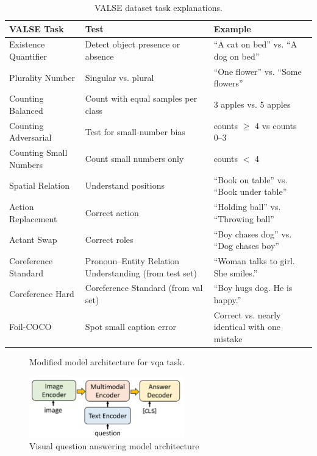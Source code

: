 \begin{table}[h]
    \caption{VALSE dataset task explanations.}
    \label{tab:valse_detail}
    \centering
    \begin{tabular}{|l|p{4cm}|p{5cm}|}
        \hline
        \textbf{VALSE Task} & \textbf{Test} & \textbf{Example} \\ \hline
        Existence Quantifier & Detect object presence or absence & ``A cat on bed'' vs. ``A dog on bed'' \\ \hline
        Plurality Number & Singular vs. plural & ``One flower'' vs. ``Some flowers'' \\ \hline
        Counting Balanced & Count with equal samples per class & 3 apples vs. 5 apples \\ \hline
        Counting Adversarial & Test for small-number bias & counts $\ge$ 4 vs counts 0–3 \\ \hline
        Counting Small Numbers & Count small numbers only & counts $<$ 4 \\ \hline
        Spatial Relation & Understand positions & ``Book on table'' vs. ``Book under table'' \\ \hline
        Action Replacement & Correct action & ``Holding ball'' vs. ``Throwing ball'' \\ \hline
        Actant Swap & Correct roles & ``Boy chases dog'' vs. ``Dog chases boy'' \\ \hline
        Coreference Standard & Pronoun–Entity Relation Understanding (from test set) & ``Woman talks to girl. She smiles.'' \\ \hline
        Coreference Hard & Coreference Standard (from val set) & ``Boy hugs dog. He is happy.'' \\ \hline
        Foil-COCO & Spot small caption error & Correct vs. nearly identical with one mistake \\ \hline
    \end{tabular}
\end{table}

\begin{figure}[h]
    \caption{Visual question answering model architecture}
    \label{fig:vqa}
    Modified model architecture for \acrshort{vqa} task.
    \begin{center}
        \includegraphics[width=0.6\textwidth]{Images/vqa_method.png}
    \end{center}
    \small
\end{figure}

